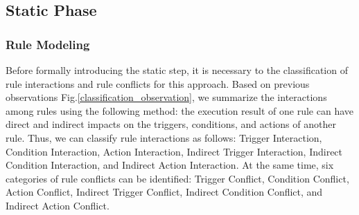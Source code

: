 \subsection{Static Phase}

\subsubsection{Rule Modeling}


Before formally introducing the static step, it is necessary to the classification of rule interactions and rule conflicts for this approach. Based on previous observations Fig.\ref{classification_observation}, we summarize the interactions among rules using the following method: the execution result of one rule can have direct and indirect impacts on the triggers, conditions, and actions of another rule. Thus, we can classify rule interactions as follows: Trigger Interaction, Condition Interaction, Action Interaction, Indirect Trigger Interaction, Indirect Condition Interaction, and Indirect Action Interaction. At the same time, six categories of rule conflicts can be identified: Trigger Conflict, Condition Conflict, Action Conflict, Indirect Trigger Conflict, Indirect Condition Conflict, and Indirect Action Conflict.

